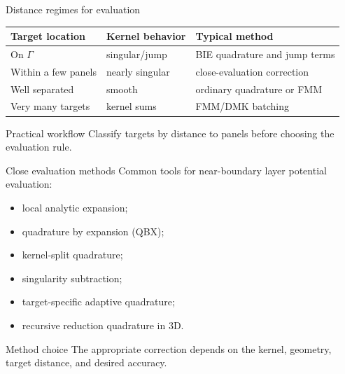 \documentclass[aspectratio=169,11pt]{beamer}
\begin{document}
\begin{frame}{Distance regimes for evaluation}
\small
\begin{center}
\renewcommand{\arraystretch}{1.2}
\begin{tabular}{lll}
\toprule
Target location & Kernel behavior & Typical method \\
\midrule
On $\Gamma$ & singular/jump & BIE quadrature and jump terms \\
Within a few panels & nearly singular & close-evaluation correction \\
Well separated & smooth & ordinary quadrature or FMM \\
Very many targets & kernel sums & FMM/DMK batching \\
\bottomrule
\end{tabular}
\end{center}

\begin{block}{Practical workflow}
Classify targets by distance to panels before choosing the evaluation rule.
\end{block}
\end{frame}

\begin{frame}{Close evaluation methods}
\small
Common tools for near-boundary layer potential evaluation:
\begin{itemize}
  \item local analytic expansion;
  \item quadrature by expansion (QBX);
  \item kernel-split quadrature;
  \item singularity subtraction;
  \item target-specific adaptive quadrature;
  \item recursive reduction quadrature in 3D.
\end{itemize}

\begin{block}{Method choice}
The appropriate correction depends on the kernel, geometry, target distance,
and desired accuracy.
\end{block}
\end{frame}
\end{document}
